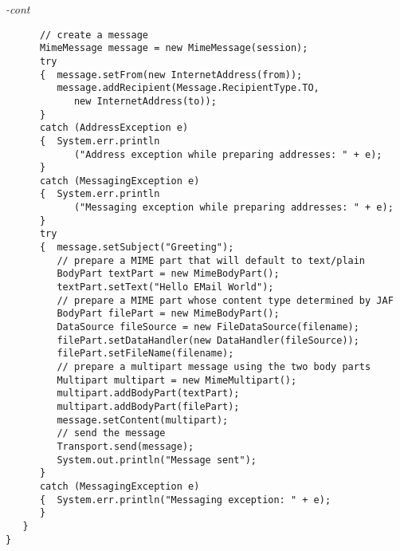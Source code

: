 \begin{figure*}\begin{program}\emph{-cont}\begin{verbatim}
      // create a message
      MimeMessage message = new MimeMessage(session);
      try
      {  message.setFrom(new InternetAddress(from));
         message.addRecipient(Message.RecipientType.TO,
            new InternetAddress(to));
      }
      catch (AddressException e)
      {  System.err.println
            ("Address exception while preparing addresses: " + e);
      }
      catch (MessagingException e)
      {  System.err.println
            ("Messaging exception while preparing addresses: " + e);
      }
      try
      {  message.setSubject("Greeting");
         // prepare a MIME part that will default to text/plain
         BodyPart textPart = new MimeBodyPart();
         textPart.setText("Hello EMail World");
         // prepare a MIME part whose content type determined by JAF
         BodyPart filePart = new MimeBodyPart();
         DataSource fileSource = new FileDataSource(filename);
         filePart.setDataHandler(new DataHandler(fileSource));
         filePart.setFileName(filename);
         // prepare a multipart message using the two body parts
         Multipart multipart = new MimeMultipart();
         multipart.addBodyPart(textPart);
         multipart.addBodyPart(filePart);
         message.setContent(multipart);
         // send the message
         Transport.send(message);
         System.out.println("Message sent");
      }
      catch (MessagingException e)
      {  System.err.println("Messaging exception: " + e);
      }
   }
}
\end{verbatim}\end{program}\end{figure*}

